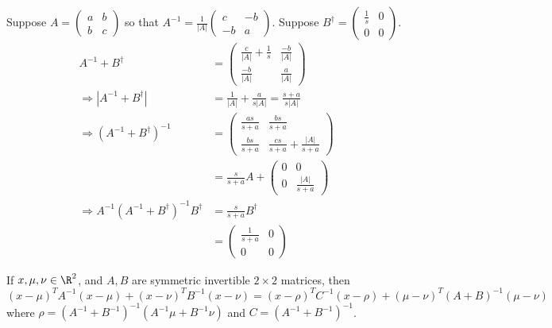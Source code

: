\documentclass{article}
\begin{document}
\begin{pf} 
Suppose $A=\left(\begin{array}{cc}a & b \\ b & c \end{array}\right)$ so that $A^{-1}=\frac{1}{|A|}\left(\begin{array}{cc}c & -b \\ -b & a \end{array}\right)$. Suppose $B^\dagger = \left(\begin{array}{cc} \frac{1}{s} & 0 \\ 0 & 0 \end{array}\right)$.
\begin{align*}
A^{-1}+B^\dagger & =\left(\begin{array}{cc}\frac{c}{|A|}+\frac{1}{s} & \frac{-b}{|A|} \\  \frac{-b}{|A|} & \frac{a}{|A|} \end{array}\right)
\\ \Rightarrow |A^{-1}+B^\dagger|&=\frac{1}{|A|}+\frac{a}{s|A|}=\frac{s+a}{s|A|}
\\ \Rightarrow (A^{-1}+B^\dagger)^{-1}&=\left(\begin{array}{cc}\frac{as}{s+a} & \frac{bs}{s+a} \\ \frac{bs}{s+a} & \frac{cs}{s+a}+\frac{|A|}{s+a} \end{array}\right)
\\ &=\frac{s}{s+a}A+\left(\begin{array}{cc}0 & 0 \\ 0 & \frac{|A|}{s+a}\end{array}\right)
\\\Rightarrow A^{-1}(A^{-1}+B^\dagger)^{-1}B^\dagger & = \frac{s}{s+a}B^\dagger
\\&=\left(\begin{array}{cc}\frac{1}{s+a} & 0 \\ 0 & 0 \end{array}\right)
\end{align*}
\end{pf}

\begin{fact} 
If $x,\mu,\nu\in\R^2$, and $A,B$ are symmetric invertible $2\times 2$ matrices, then 
\begin{equation}
(x-\mu)^TA^{-1}(x-\mu)+(x-\nu)^TB^{-1}(x-\nu)=(x-\rho)^TC^{-1}(x-\rho)+(\mu-\nu)^T(A+B)^{-1}(\mu-\nu)
\end{equation}
where $\rho=(A^{-1}+B^{-1})^{-1}(A^{-1}\mu+B^{-1}\nu)$ and $C=(A^{-1}+B^{-1})^{-1}$.
\end{fact}
\end{document}
